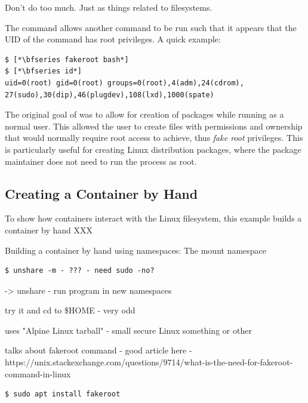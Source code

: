 Don't do too much. Just as things related to filesystems.

The  command allows another command to be run such that it appears that the UID of the command has root privileges. A quick example:

\begin{lstlisting}
$ [*\bfseries fakeroot bash*]
$ [*\bfseries id*]
uid=0(root) gid=0(root) groups=0(root),4(adm),24(cdrom),
27(sudo),30(dip),46(plugdev),108(lxd),1000(spate)
\end{lstlisting}

\noindent
The original goal of  was to allow for creation of packages while running as a normal user. This allowed the user to create files with permissions and ownership that would normally require root access to achieve, thus \textit{fake root} privileges. This is particularly useful for creating Linux distribution packages, where the package maintainer does not need to run the process as root.


\subsection{Creating a Container by Hand}

To show how containers interact with the Linux filesystem, this example builds a container by hand XXX

Building a container by hand using namespaces: The mount namespace %

\begin{lstlisting}
$ unshare -m - ??? - need sudo -no?
\end{lstlisting}

-> unshare - run program in new namespaces

try it and cd to \$HOME - very odd

uses "Alpine Linux tarball" - small secure Linux something or other

talks about fakeroot command - good article here - https://unix.stackexchange.com/questions/9714/what-is-the-need-for-fakeroot-command-in-linux

\begin{lstlisting}
$ sudo apt install fakeroot
\end{lstlisting}

